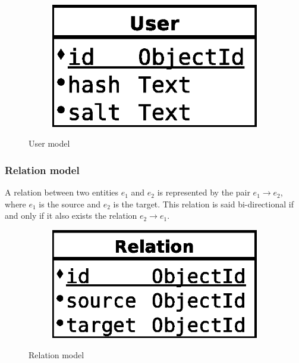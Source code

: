 \begin{figure}[H]
    \centering
    \begin{subfigure}[b]{0.25\textwidth}
    	\includegraphics[width=\textwidth]{figures/model_user}
    \end{subfigure}
    \caption{User model}
\end{figure} 

\subsubsection{Relation model}

A relation between two entities $e_1$ and $e_2$ is represented by the pair $e_1\rightarrow e_2$, where $e_1$ is the source and $e_2$ is the target. This relation is said bi-directional if and only if it also exists the relation $e_2\rightarrow e_1$.

\begin{figure}[H]
    \centering
    \begin{subfigure}[b]{0.25\textwidth}
    	\includegraphics[width=\textwidth]{figures/model_relation}
    \end{subfigure}
    \caption{Relation model}
\end{figure} 


